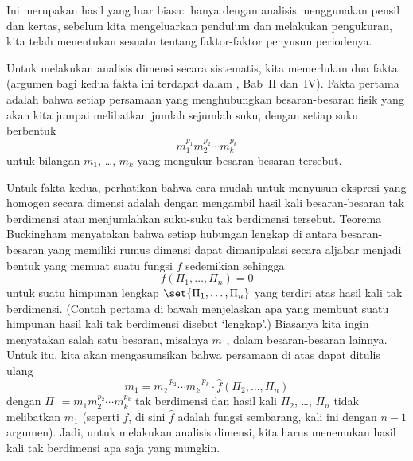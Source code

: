 Ini merupakan hasil yang luar biasa:~hanya dengan analisis menggunakan
pensil dan kertas, sebelum kita mengeluarkan pendulum dan melakukan pengukuran,
kita telah menentukan sesuatu tentang faktor-faktor penyusun periodenya.

Untuk melakukan analisis dimensi secara sistematis, kita memerlukan dua fakta
(argumen bagi kedua fakta ini terdapat dalam \cite{Bridgman}, Bab~II dan~IV).
Fakta pertama adalah bahwa setiap persamaan yang menghubungkan besaran-besaran
fisik yang akan kita jumpai melibatkan jumlah sejumlah suku,
dengan setiap suku berbentuk
\begin{equation*}
  m_1^{p_1}m_2^{p_2}\cdots m_k^{p_k}
\end{equation*}
untuk bilangan $m_1$, \ldots, $m_k$ yang mengukur besaran-besaran tersebut.

Untuk fakta kedua, perhatikan bahwa cara mudah untuk menyusun ekspresi yang
homogen secara dimensi adalah dengan mengambil hasil kali besaran-besaran tak
berdimensi atau menjumlahkan suku-suku tak berdimensi tersebut.
Teorema Buckingham menyatakan bahwa setiap
hubungan lengkap di antara besaran-besaran yang memiliki
rumus dimensi dapat dimanipulasi secara aljabar menjadi bentuk yang memuat
suatu fungsi $f$ sedemikian sehingga
\begin{equation*}
  f(\Pi_1,\ldots,\Pi_n)=0
\end{equation*}
untuk suatu himpunan lengkap $\set{\Pi_1,\ldots,\Pi_n}$ yang terdiri atas
hasil kali tak berdimensi.
(Contoh pertama di bawah menjelaskan apa yang membuat suatu himpunan hasil kali
tak berdimensi disebut `lengkap'.)
Biasanya kita ingin menyatakan salah satu besaran,
misalnya $m_1$, dalam besaran-besaran lainnya.
Untuk itu, kita akan mengasumsikan bahwa persamaan di atas dapat ditulis ulang
\begin{equation*}
  m_1=m_2^{-p_2}\cdots m_k^{-p_k}\cdot \hat{f}(\Pi_2,\ldots,\Pi_n)
\end{equation*}
dengan $\Pi_1=m_1m_2^{p_2}\cdots m_k^{p_k}$ tak berdimensi
dan hasil kali $\Pi_2$, \ldots, $\Pi_n$ tidak melibatkan $m_1$
(seperti $f$, di sini $\hat{f}$ adalah fungsi sembarang, kali ini
dengan $n-1$ argumen).
Jadi, untuk melakukan analisis dimensi, kita harus
menemukan hasil kali tak berdimensi apa saja yang mungkin.

